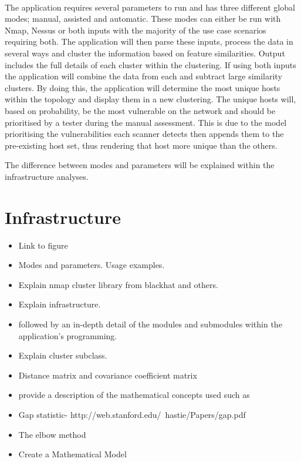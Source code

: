 \paragraph{}The application requires several parameters to run and has three different global modes; manual, assisted and automatic. These modes can either be run with Nmap, Nessus or both inputs with the majority of the use case scenarios requiring both. The application will then parse these inputs, process the data in several ways and cluster the information based on feature similarities. Output includes the full details of each cluster within the clustering. If using both inputs the application will combine the data from each and subtract large similarity clusters. By doing this, the application will determine the most unique hosts within the topology and display them in a new clustering. The unique hosts will, based on probability, be the most vulnerable on the network and should be prioritised by a tester during the manual assessment. This is due to the model prioritising the vulnerabilities each scanner detects then appends them to the pre-existing host set, thus rendering that host more unique than the others.

The difference between modes and parameters will be explained within the infrastructure analyses.


\section{Infrastructure}
\label{sec:section2}

\begin{itemize}
\item Link to figure
\item Modes and parameters. Usage examples.
\item Explain nmap cluster library from blackhat and others.
\item Explain infrastructure.
\item followed by an in-depth detail of the modules and submodules within the application’s programming.
\item Explain cluster subclass.

\item Distance matrix and covariance coefficient matrix
\item provide a description of the mathematical concepts used such as
\item Gap statistic- http://web.stanford.edu/~hastie/Papers/gap.pdf
\item The elbow method
\item Create a Mathematical Model
\end{itemize}



